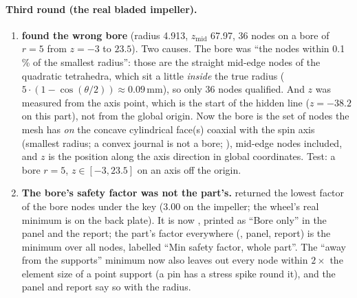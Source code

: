 \paragraph{Third round (the real bladed impeller).}
\begin{enumerate}[nosep]
  \item \textbf{ found the wrong bore} (radius 4.913, $z_{\mathrm{mid}}$ 67.97, 36 nodes on a bore of
        $r=5$ from $z=-3$ to $23.5$). Two causes. The bore was ``the nodes within 0.1\,\% of the smallest radius'': those are
        the straight mid-edge nodes of the quadratic tetrahedra, which sit a little \emph{inside} the true radius
        ($5\cdot(1-\cos(\theta/2))\approx0.09$\,mm), so only 36 nodes qualified. And $z$ was measured from the axis point, which
        is the start of the hidden  line ($z=-38.2$ on this part), not from the global origin. Now the bore is the
        set of nodes the mesh has \emph{on} the concave cylindrical face(s) coaxial with the spin axis (smallest radius; a
        convex journal is not a bore; ), mid-edge nodes included, and $z$ is the position along the axis
        direction in global coordinates. Test: a bore $r=5$, $z\in[-3,23.5]$ on an axis off the origin.
  \item \textbf{The bore's safety factor was not the part's.}  returned the lowest factor of the bore
        nodes under the key  (3.00 on the impeller; the wheel's real minimum is on the back plate). It is now
        , printed as ``Bore only'' in the panel and the report; the part's factor everywhere
        (, panel, report) is the minimum over all nodes, labelled ``Min safety factor, whole part''. The
        ``away from the supports'' minimum now also leaves out every node within $2\times$ the element size of a point support
        (a pin has a stress spike round it), and the panel and report say so with the radius.
\end{enumerate}


